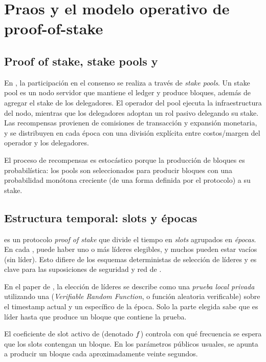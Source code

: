 \section{Praos y el modelo operativo de proof-of-stake}
\label{sec:motivation-praos-y-el-modelo-operativo-de-proof-of-stake}
\subsection{Proof of stake, stake pools y \SPOs}
\label{subsec:motivation-proof-of-stake-stake-pools-y-spos}
En \Cardano, la participación en el consenso se realiza a través de \emph{stake pools}. Un stake pool es un nodo servidor que mantiene el ledger y produce bloques, además de agregar el stake de los delegadores. El operador del pool ejecuta la infraestructura del nodo, mientras que los delegadores adoptan un rol pasivo delegando su stake. Las recompensas provienen de comisiones de transacción y expansión monetaria, y se distribuyen en cada época con una división explícita entre costos/margen del operador y los delegadores.

El proceso de recompensas es estocástico porque la producción de bloques es probabilística: los pools son seleccionados para producir bloques con una probabilidad monótona creciente (de una forma definida por el protocolo) a su stake.

\subsection{Estructura temporal: slots y épocas}
\label{subsec:motivation-estructura-temporal-slots-y-epocas}
\Praos \cite{cryptoeprint:2017/573} es un protocolo \textit{proof of stake} que divide el tiempo en \emph{slots} agrupados en \emph{épocas}. En cada \Slot, puede haber uno o más líderes elegibles, y muchos \Slot pueden estar vacíos (sin líder). Esto difiere de los esquemas deterministas de selección de líderes y es clave para las suposiciones de seguridad y red de \Praos.

En el paper de \Praos, la elección de líderes se describe como una \emph{prueba local privada} utilizando una \VRF (\textit{Verifiable Random Function}, o función aleatoria verificable) sobre el timestamp actual y un \Nonce específico de la época. Solo la parte elegida sabe que es líder hasta que produce un bloque que contiene la prueba.

El coeficiente de slot activo de \Cardano (denotado $f$) controla con qué frecuencia se espera que los slots contengan un bloque. En los parámetros públicos usuales, se apunta a producir un bloque cada aproximadamente veinte segundos.

